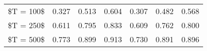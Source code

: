 % 
\begin{tabular}{ccccccc}
  \hline
  \hline
\$T = 100\$ & 0.327 & 0.513 & 0.604 & 0.307 & 0.482 & 0.568 \\ 
  \$T = 250\$ & 0.611 & 0.795 & 0.833 & 0.609 & 0.762 & 0.800 \\ 
  \$T = 500\$ & 0.773 & 0.899 & 0.913 & 0.730 & 0.891 & 0.896 \\ 
   \hline
\end{tabular}
